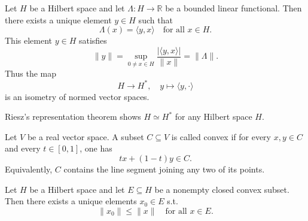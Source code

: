 \begin{theorem}
    Let \(H\) be a Hilbert space and let \(\Lambda : H \to \mathbb{R}\) be a bounded linear functional. Then there exists a unique element \(y \in H\) such that 
    \[
        \Lambda (x) = \langle y, x \rangle \quad \text{for all } x \in H.  
    \]  
    This element \(y \in H\) satisfies 
    \[
        \lVert y \rVert = \sup _{0 \neq x \in H} \frac{\vert \langle y, x \rangle  \vert }{\lVert x \rVert } = \lVert \Lambda \rVert.  
    \] 
    Thus the map 
    \[
        H \to H^*, \quad y \mapsto \langle y, \cdot \rangle 
    \]
    is an isometry of normed vector spaces.
\end{theorem}

\begin{remark}
    Riesz's representation theorem shows \(H \simeq H^*\) for any Hilbert space \(H\).  
\end{remark}

\begin{definition}
    Let \(V\) be a real vector space. A subset \(C \subseteq V\) is called convex if for every \(x, y \in C\) and every \(t \in [0, 1]\), one has 
    \[
        tx + (1 - t)y \in C.
    \]    
    Equivalently, \(C\) contains the line segment joining any two of its points. 
\end{definition}

\begin{theorem} \label{thm: projection theorem}
    Let \(H\) be a Hilbert space and let \(E \subseteq H\) be a nonempty closed convex subset. Then there exists a unique elements \(x_0 \in E\) s.t. 
    \[
        \lVert x_0 \rVert \le \lVert x \rVert \quad \text{for all } x \in E.   
    \]   
\end{theorem}

